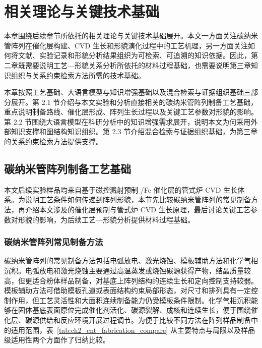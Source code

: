 \chapter{相关理论与关键技术基础}

本章围绕后续章节所依托的相关理论与关键技术基础展开。本文一方面关注碳纳米管阵列在催化层构建、CVD 生长和形貌演化过程中的工艺机理，另一方面关注如何将文献、实验记录和形貌分析结果组织为可检索、可追溯的知识依据。因此，第二章既需要说明工艺—形貌关系分析所依托的材料过程基础，也需要说明第三章知识组织与关系约束检索方法所需的技术基础。

本章按照工艺基础、大语言模型与知识增强基础以及混合检索与证据组织基础三部分展开。第 2.1 节介绍与本文实验和分析直接相关的碳纳米管阵列制备工艺基础，重点说明制备路线、催化层形成、阵列生长过程以及关键工艺参数对形貌的影响。第 2.2 节围绕大语言模型在科研分析中的知识增强需求展开，说明本文为何采用外部知识支撑和图结构知识组织。第 2.3 节介绍混合检索与证据组织基础，为第三章的关系约束检索方法提供支撑。

\section{碳纳米管阵列制备工艺基础}

本文后续实验样品均来自基于磁控溅射预制 /Fe 催化层的管式炉 CVD 生长体系。为说明工艺条件如何传递到阵列形貌，本节先比较碳纳米管阵列的常见制备方法，再介绍本文涉及的催化层预制与管式炉 CVD 生长原理，最后讨论关键工艺参数对形貌的影响，为后续工艺—形貌分析提供材料过程基础。

\subsection{碳纳米管阵列常见制备方法}

碳纳米管阵列的常见制备方法包括电弧放电、激光烧蚀、模板辅助方法和化学气相沉积\cite{Wu2025VACNTReview,Liang2014VACNTReviewCN}。电弧放电和激光烧蚀主要通过高温蒸发或烧蚀碳源获得产物，结晶质量较高，但更适合粉体样品制备，对基底上阵列结构的连续生长和定向控制支持较弱。模板辅助方法可借助模板孔道或表面结构约束局部形态，对尺寸和排列具有一定控制作用，但工艺灵活性和大面积连续制备能力仍受模板条件限制。化学气相沉积能够在固体基底表面原位完成催化剂活化、碳源裂解、成核和连续生长，便于围绕催化层、碳源供给和反应环境开展过程调节。为便于比较不同方法在阵列样品制备中的适用范围，表~\ref{tab:ch2_cnt_fabrication_compare} 从主要特点与局限以及样品级适用性两个方面作了归纳比较。

